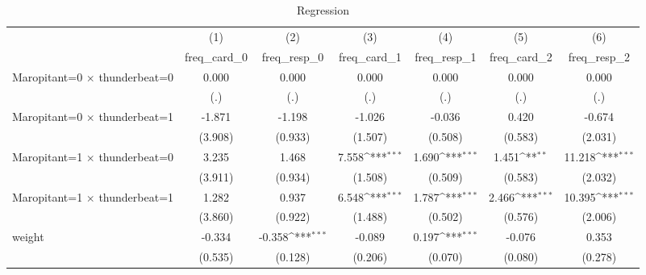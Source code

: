 \begin{table}[htbp]\centering
\def\sym#1{\ifmmode^{#1}\else\(^{#1}\)\fi}
\caption{Regression}
\begin{tabular}{l*{6}{c}}
\toprule
                    &\multicolumn{1}{c}{(1)}&\multicolumn{1}{c}{(2)}&\multicolumn{1}{c}{(3)}&\multicolumn{1}{c}{(4)}&\multicolumn{1}{c}{(5)}&\multicolumn{1}{c}{(6)}\\
                    &\multicolumn{1}{c}{freq\_card\_0}&\multicolumn{1}{c}{freq\_resp\_0}&\multicolumn{1}{c}{freq\_card\_1}&\multicolumn{1}{c}{freq\_resp\_1}&\multicolumn{1}{c}{freq\_card\_2}&\multicolumn{1}{c}{freq\_resp\_2}\\
\midrule
Maropitant=0 $\times$ thunderbeat=0&       0.000         &       0.000         &       0.000         &       0.000         &       0.000         &       0.000         \\
                    &         (.)         &         (.)         &         (.)         &         (.)         &         (.)         &         (.)         \\
\addlinespace
Maropitant=0 $\times$ thunderbeat=1&      -1.871         &      -1.198         &      -1.026         &      -0.036         &       0.420         &      -0.674         \\
                    &     (3.908)         &     (0.933)         &     (1.507)         &     (0.508)         &     (0.583)         &     (2.031)         \\
\addlinespace
Maropitant=1 $\times$ thunderbeat=0&       3.235         &       1.468         &       7.558\sym{***}&       1.690\sym{***}&       1.451\sym{**} &      11.218\sym{***}\\
                    &     (3.911)         &     (0.934)         &     (1.508)         &     (0.509)         &     (0.583)         &     (2.032)         \\
\addlinespace
Maropitant=1 $\times$ thunderbeat=1&       1.282         &       0.937         &       6.548\sym{***}&       1.787\sym{***}&       2.466\sym{***}&      10.395\sym{***}\\
                    &     (3.860)         &     (0.922)         &     (1.488)         &     (0.502)         &     (0.576)         &     (2.006)         \\
\addlinespace
weight              &      -0.334         &      -0.358\sym{***}&      -0.089         &       0.197\sym{***}&      -0.076         &       0.353         \\
                    &     (0.535)         &     (0.128)         &     (0.206)         &     (0.070)         &     (0.080)         &     (0.278)         \\

\end{tabular}
\end{table}
